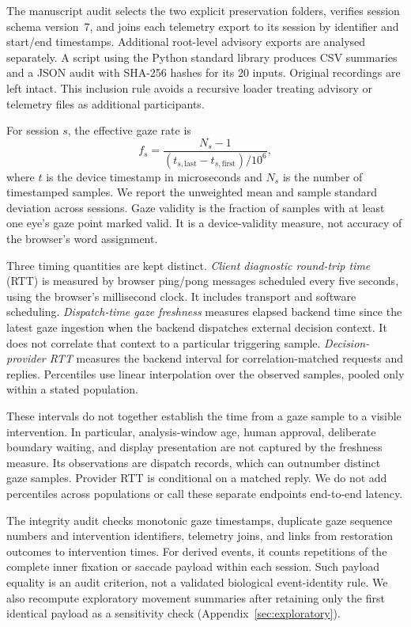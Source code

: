 The manuscript audit selects the two explicit preservation folders, verifies session schema version~7, and joins each telemetry export to its session by identifier and start/end timestamps. Additional root-level advisory exports are analysed separately. A script using the Python standard library produces CSV summaries and a JSON audit with SHA-256 hashes for its 20 inputs. Original recordings are left intact. This inclusion rule avoids a recursive loader treating advisory or telemetry files as additional participants.

For session $s$, the effective gaze rate is
\begin{equation}
 f_s=\frac{N_s-1}{(t_{s,\mathrm{last}}-t_{s,\mathrm{first}})/10^6},
\end{equation}
where $t$ is the device timestamp in microseconds and $N_s$ is the number of timestamped samples. We report the unweighted mean and sample standard deviation across sessions. Gaze validity is the fraction of samples with at least one eye's gaze point marked valid. It is a device-validity measure, not accuracy of the browser's word assignment.

Three timing quantities are kept distinct. \textit{Client diagnostic round-trip time} (RTT) is measured by browser ping/pong messages scheduled every five seconds, using the browser's millisecond clock. It includes transport and software scheduling. \textit{Dispatch-time gaze freshness} measures elapsed backend time since the latest gaze ingestion when the backend dispatches external decision context. It does not correlate that context to a particular triggering sample. \textit{Decision-provider RTT} measures the backend interval for correlation-matched requests and replies. Percentiles use linear interpolation over the observed samples, pooled only within a stated population.

These intervals do not together establish the time from a gaze sample to a visible intervention. In particular, analysis-window age, human approval, deliberate boundary waiting, and display presentation are not captured by the freshness measure. Its observations are dispatch records, which can outnumber distinct gaze samples. Provider RTT is conditional on a matched reply. We do not add percentiles across populations or call these separate endpoints end-to-end latency.

The integrity audit checks monotonic gaze timestamps, duplicate gaze sequence numbers and intervention identifiers, telemetry joins, and links from restoration outcomes to intervention times. For derived events, it counts repetitions of the complete inner fixation or saccade payload within each session. Such payload equality is an audit criterion, not a validated biological event-identity rule. We also recompute exploratory movement summaries after retaining only the first identical payload as a sensitivity check (Appendix~\ref{sec:exploratory}).

